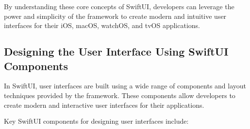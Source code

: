 \documentclass[
  biblatex,
  language=english,
  figures=false,
  sourcecodes,
  glossaries,
  index
]{kidiplom}
\begin{document}
By understanding these core concepts of SwiftUI, developers can leverage the power and simplicity of the framework to create modern and intuitive user interfaces for their iOS, macOS, watchOS, and tvOS applications.

\subsection{Designing the User Interface Using SwiftUI Components}

In SwiftUI, user interfaces are built using a wide range of components and layout techniques provided by the framework. These components allow developers to create modern and interactive user interfaces for their applications.

Key SwiftUI components for designing user interfaces include:
\end{document}
